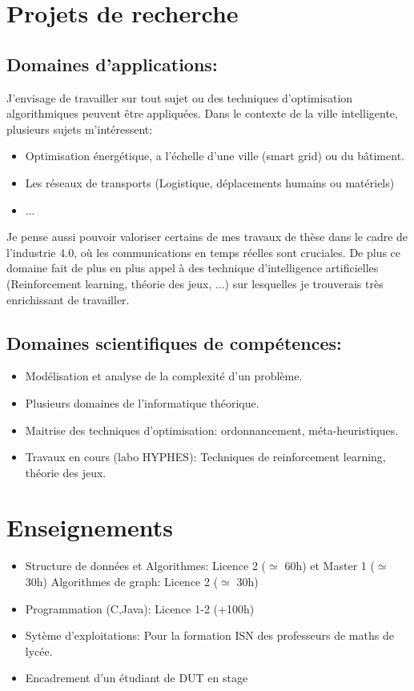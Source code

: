 \documentclass[a4paper,10pt]{article}
\begin{document}
\section{Projets de recherche}
\subsection{Domaines d'applications:}
J'envisage de travailler sur tout sujet ou des techniques d'optimisation algorithmiques peuvent être appliquées. Dans le contexte de la ville intelligente, plusieurs sujets m'intéressent:\begin{itemize}
\item Optimisation énergétique, a l'échelle d'une ville (smart grid) ou du bâtiment.
\item Les réseaux de transports (Logistique, déplacements humains ou matériels)
\item ... 
\end{itemize}

Je pense aussi pouvoir valoriser certains de mes travaux de thèse dans le cadre de l'industrie 4.0, où les communications en temps réelles sont cruciales. De plus ce domaine fait de plus en plus appel à des technique d'intelligence artificielles (Reinforcement learning, théorie des jeux, ...) sur lesquelles je trouverais très enrichissant de travailler.
\subsection{Domaines scientifiques de compétences:}
\begin{itemize}
\item Modélisation et analyse de la complexité d’un problème.
\item Plusieurs domaines de l’informatique théorique.
\item Maitrise des techniques d’optimisation: ordonnancement, méta-heuristiques.
\item Travaux en cours (labo HYPHES): Techniques de reinforcement learning, théorie des jeux.
\end{itemize}
\section{Enseignements}
\begin{itemize}
\item Structure de données et Algorithmes: Licence 2 ($\simeq$ 60h) et Master 1 ($\simeq$ 30h) Algorithmes de graph: Licence 2 ($\simeq$ 30h)
\item Programmation (C,Java): Licence 1-2 (+100h)
\item Sytème d’exploitations: Pour la formation ISN des professeurs de maths de lycée.
\item Encadrement d’un étudiant de DUT en stage
\end{itemize}
\end{document}
